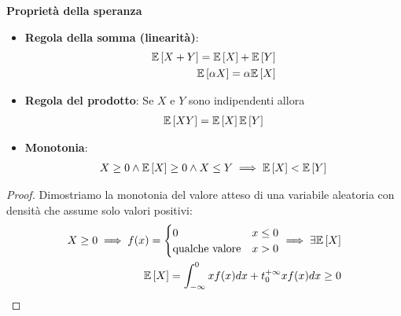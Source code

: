 \begin{defn}
    \textbf{Proprietà della speranza} \\
    \begin{itemize}
        \item \textbf{Regola della somma (linearità)}:
        \begin{equation*}
            \begin{aligned}
                \mathbb{E}\left[X + Y\right] = \mathbb{E}\left[X\right] + \mathbb{E}\left[Y\right] \\
                \mathbb{E}\left[\alpha X\right] = \alpha \mathbb{E}\left[X\right]
            \end{aligned}
        \end{equation*}
        \item \textbf{Regola del prodotto}: Se $X$ e $Y$ sono indipendenti allora
        \begin{equation*}
            \begin{aligned}
                \mathbb{E}\left[XY\right] = \mathbb{E}\left[X\right] \mathbb{E}\left[Y\right]
            \end{aligned}
        \end{equation*}
        \item \textbf{Monotonia}:
            \begin{equation*}
                \begin{aligned}
                    X \geq 0 \land \mathbb{E}\left[X\right] \geq 0 \land X \leq Y \implies \mathbb{E}\left[X\right] < \mathbb{E}\left[Y\right]
                \end{aligned}
            \end{equation*}
    \end{itemize}

    \begin{proof}
        Dimostriamo la monotonia del valore atteso di una variabile aleatoria
        con densità che assume solo valori positivi:
        \begin{equation*}
            \begin{aligned}
                X \geq 0 \implies f(x) = \begin{cases}
                    0 & x \leq 0 \\
                    \text{qualche valore} & x > 0
                \end{cases} \implies \exists \mathbb{E}\left[X\right] \\
                \mathbb{E}\left[X\right] = \int_{-\infty}^{0} x f(x) dx + t_{0}^{+\infty} x f(x) dx \geq 0
            \end{aligned}
        \end{equation*}
    \end{proof}
    
\end{defn}

